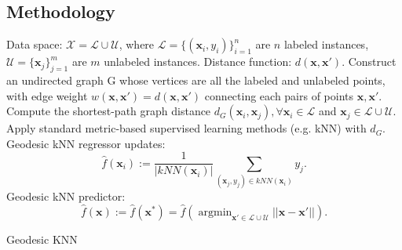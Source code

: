 \documentclass[a0,landscape]{a0poster}
\begin{document}
\begin{multicols}{4}
\section*{Methodology}
\begin{algorithm}[H]
\begin{algorithmic}
   Data space: $\mathcal{X} = \mathcal{L} \cup \mathcal{U}$, where $\mathcal{L} = \{(\textbf{x}_i,y_i)\}_{i=1}^n$ are $n$ labeled instances, $\mathcal{U} = \{\textbf{x}_j\}_{j=1}^m$ are $m$ unlabeled instances.
   Distance function: $d(\textbf{x},\textbf{x}')$.
   Construct an undirected graph G whose vertices are all the labeled and unlabeled points, with edge weight $w(\textbf{x},\textbf{x}') = d(\textbf{x},\textbf{x}')$ connecting each pairs of points $\textbf{x},\textbf{x}'$.
   Compute the shortest-path graph distance $d_G(\textbf{x}_i,\textbf{x}_j), \forall \textbf{x}_i \in \mathcal{L}$ and $\textbf{x}_j \in \mathcal{L}\cup\mathcal{U}$.
   Apply standard metric-based supervised learning methods (e.g. kNN) with $d_G$.
   Geodesic kNN \color{brown}regressor updates\color{black}:
    \[\hat f(\textbf{x}_i):=\dfrac{1}{|kNN(\textbf{x}_i)|} \sum_{(\textbf{x}_j,y_j)\in kNN(\textbf{x}_i)}y_j.\]
   Geodesic kNN \color{red}predictor\color{black}:
  \[\hat f(\textbf{x}):=\hat f(\textbf{x}^*)=\hat f\left(\mathop{\arg\min}_{\textbf{x}' \in \mathcal{L}\cup\mathcal{U}}||\textbf{x}-\textbf{x}'||\right).\]
\end{algorithmic}
 \caption{Geodesic KNN}
\end{algorithm}


\end{multicols}
\end{document}
